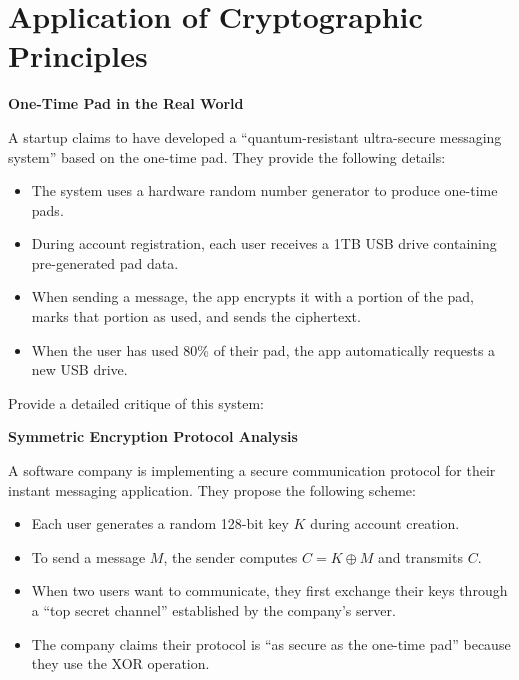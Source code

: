 \documentclass[10pt,a4paper,american]{exam}
\begin{document}
\section{Application of Cryptographic Principles}
\begin{questions}
	\question[15] \textbf{One-Time Pad in the Real World}

	A startup claims to have developed a ``quantum-resistant ultra-secure messaging system'' based on the one-time pad. They provide the following details:

	\begin{itemize}
		\item The system uses a hardware random number generator to produce one-time pads.
		\item During account registration, each user receives a 1TB USB drive containing pre-generated pad data.
		\item When sending a message, the app encrypts it with a portion of the pad, marks that portion as used, and sends the ciphertext.
		\item When the user has used 80\% of their pad, the app automatically requests a new USB drive.
	\end{itemize}

	Provide a detailed critique of this system:

	\question[15] \textbf{Symmetric Encryption Protocol Analysis}

	A software company is implementing a secure communication protocol for their instant messaging application. They propose the following scheme:

	\begin{itemize}
		\item Each user generates a random 128-bit key $K$ during account creation.
		\item To send a message $M$, the sender computes $C = K \oplus M$ and transmits $C$.
		\item When two users want to communicate, they first exchange their keys through a ``top secret channel'' established by the company's server.
		\item The company claims their protocol is ``as secure as the one-time pad'' because they use the XOR operation.
	\end{itemize}


\end{questions}
\end{document}
